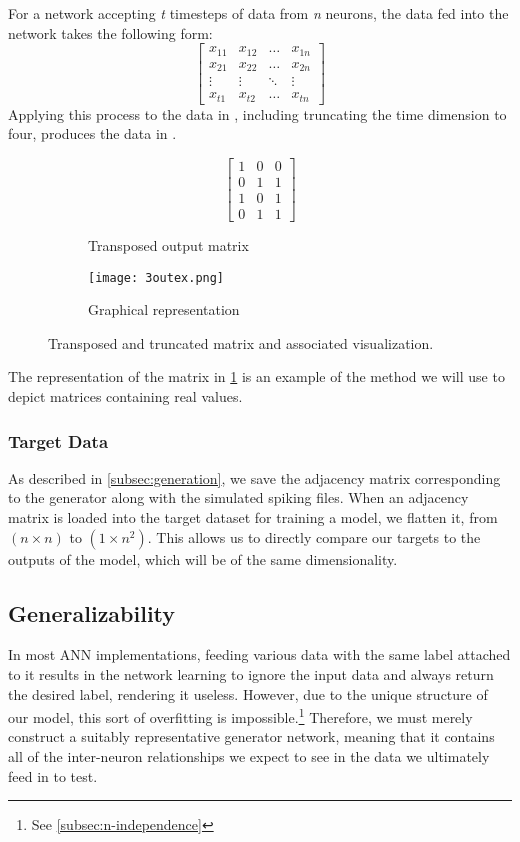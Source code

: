 For a network accepting \textit{t} timesteps of data from \textit{n} neurons, 
the data fed into the network takes the following form:
\[ \begin{bmatrix}
		x_{11} & x_{12} & \dots & x_{1n}\\
		x_{21} & x_{22} & \dots & x_{2n}\\
		\vdots & \vdots & \ddots & \vdots\\
		x_{t1} & x_{t2} & \dots & x_{tn}
	\end{bmatrix} \]
Applying this process to the data in , including truncating 
the time dimension to four, produces the data in .
\begin{figure}[H]
	\centering
	\begin{subfigure}{.48\textwidth}
		\[
			\begin{bmatrix}
				1 & 0 & 0\\
				0 & 1 & 1\\
				1 & 0 & 1\\
				0 & 1 & 1
			\end{bmatrix}
		\]
		\caption{Transposed output matrix}
	\end{subfigure}
	\begin{subfigure}{.48\textwidth}
		\centering
		\texttt{[image: 3outex.png]}
		\caption{Graphical representation}
		\label{subfig:3outexgraph}
	\end{subfigure}
	\caption{Transposed and truncated matrix and associated visualization.}
	\label{fig:data+vis}
\end{figure}\noindent
The representation of the matrix in \ref{subfig:3outexgraph} is an example of 
the method we will use to depict matrices containing real values.

\subsubsection{Target Data}
\label{subsubsec:targetdata}
As described in \ref{subsec:generation}, we save the adjacency matrix 
corresponding to the generator along with the simulated spiking files. When an 
adjacency matrix is loaded into the target dataset for training a model, we 
flatten it, from $(n \times n)$ to $(1 \times n^2)$. This allows us to directly 
compare our targets to the outputs of the model, which will be of the same 
dimensionality.

\subsection{Generalizability}
\label{subsec:hotswap}
In most ANN implementations, feeding various data with the same label attached 
to it results in the network learning to ignore the input data and always return 
the desired label, rendering it useless. However, due to the unique structure of 
our model, this sort of overfitting is impossible.\footnote{See 
\ref{subsec:n-independence}} Therefore, we must merely construct a suitably 
representative generator network, meaning that it contains all of the 
inter-neuron relationships we expect to see in the data we ultimately feed in to 
test.

